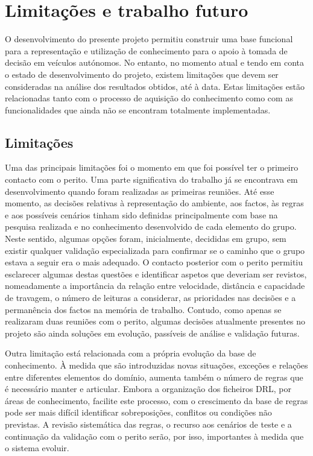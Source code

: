 \chapter{Limitações e trabalho futuro}
\label{cap:limitacoes}

O desenvolvimento do presente projeto permitiu construir uma base funcional
para a representação e utilização de conhecimento para o apoio à tomada de
decisão em veículos autónomos. No entanto, no momento atual e tendo em conta
o estado de desenvolvimento do projeto, existem limitações que devem ser
consideradas na análise dos resultados obtidos, até à data. Estas limitações
estão relacionadas tanto com o processo de aquisição do conhecimento como com
as funcionalidades que ainda não se encontram totalmente implementadas.

\section{Limitações}
\label{sec:limitacoes}

Uma das principais limitações foi o momento em que foi possível ter o
primeiro contacto com o perito. Uma parte significativa do trabalho já se
encontrava em desenvolvimento quando foram realizadas as primeiras reuniões.
Até esse momento, as decisões relativas à representação do ambiente, aos
factos, às regras e aos possíveis cenários tinham sido definidas
principalmente com base na pesquisa realizada e no conhecimento desenvolvido
de cada elemento do grupo. Neste sentido, algumas opções foram, inicialmente,
decididas em grupo, sem existir qualquer validação especializada para
confirmar se o caminho que o grupo estava a seguir era o mais adequado. O
contacto posterior com o perito permitiu esclarecer algumas destas questões e
identificar aspetos que deveriam ser revistos, nomeadamente a importância da
relação entre velocidade, distância e capacidade de travagem, o número de
leituras a considerar, as prioridades nas decisões e a permanência dos factos
na memória de trabalho. Contudo, como apenas se realizaram duas reuniões com
o perito, algumas decisões atualmente presentes no projeto são ainda soluções
em evolução, passíveis de análise e validação futuras.

Outra limitação está relacionada com a própria evolução da base de
conhecimento. À medida que são introduzidas novas situações, exceções e
relações entre diferentes elementos do domínio, aumenta também o número de
regras que é necessário manter e articular. Embora a organização dos
ficheiros DRL, por áreas de conhecimento, facilite este processo, com o
crescimento da base de regras pode ser mais difícil identificar sobreposições,
conflitos ou condições não previstas. A revisão sistemática das regras, o
recurso aos cenários de teste e a continuação da validação com o perito serão,
por isso, importantes à medida que o sistema evoluir.

